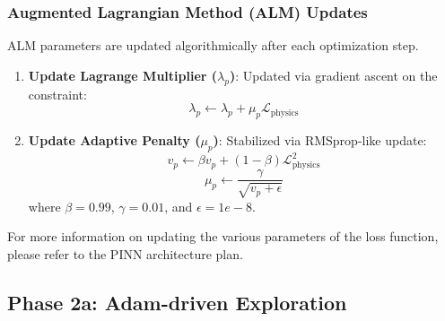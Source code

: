 \subsubsection*{Augmented Lagrangian Method (ALM) Updates}
ALM parameters are updated algorithmically after each optimization step.
\begin{enumerate}
    \item \textbf{Update Lagrange Multiplier ($\lambda_p$)}: Updated via gradient ascent on the constraint:
    \begin{equation}
    \lambda_{p} \leftarrow \lambda_{p} + \mu_{p}\mathcal{L}_{\text{physics}}
    \end{equation}
    \item \textbf{Update Adaptive Penalty ($\mu_p$)}: Stabilized via RMSprop-like update:
    \begin{equation}
    v_{p} \leftarrow \beta v_{p} + (1-\beta)\mathcal{L}_{\text{physics}}^{2}
    \end{equation}
    \begin{equation}
    \mu_{p} \leftarrow \frac{\gamma}{\sqrt{v_{p}+\epsilon}}
    \end{equation}
    where $\beta=0.99$, $\gamma=0.01$, and $\epsilon=1e-8$.
\end{enumerate}

For more information on updating the various parameters of the loss function, please refer to the PINN architecture plan.

\subsection{Phase 2a: Adam-driven Exploration}

